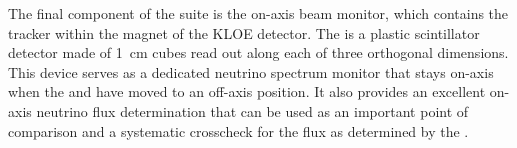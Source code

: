 The final component of the   suite is the on-axis beam monitor, which contains the
 tracker within the magnet of the KLOE detector.  The  is a plastic scintillator detector made of \SI{1}{cm} cubes read out along each of three orthogonal dimensions.  
This device serves as a dedicated  neutrino spectrum monitor that stays on-axis  when the  and  have moved to an off-axis position. 
It also provides an excellent on-axis neutrino flux determination that can be used as an important point of comparison and a systematic crosscheck for the flux as determined by the .


